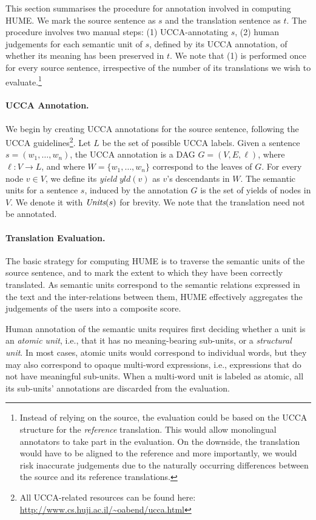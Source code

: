 \documentclass[11pt]{article}
\def\func#1{\text{\it #1}}  %
\def\Units{\func{Units}}
\begin{document}
This section summarises the procedure for annotation involved in computing HUME.
We mark the source sentence as $s$ and the translation sentence as $t$. 
The procedure involves two manual steps: (1) UCCA-annotating $s$, 
(2) human judgements for each semantic unit of $s$,
defined by its UCCA annotation, of whether its meaning has been preserved in $t$.
We note that (1) is performed once for every source sentence, irrespective
of the number of its translations we wish to evaluate.\footnote{Instead of
relying on the source,
the evaluation could be based on the UCCA structure for the \emph{reference}
translation. This would allow monolingual annotators to take part in the
evaluation. On the downside, the translation would have to be aligned to the
reference and more importantly, we would risk inaccurate judgements due to
the naturally occurring differences between the source and its reference
translations.}

\paragraph{UCCA Annotation.}
We begin by creating UCCA annotations for the source sentence, following the
UCCA guidelines\footnote{All UCCA-related resources can be found
  here: \url{http://www.cs.huji.ac.il/~oabend/ucca.html}}.
Let $L$ be the set of possible UCCA labels.
Given a sentence $s = (w_1, \ldots,w_n)$, the UCCA annotation is a DAG $G=(V,E,\ell)$,
where $\ell: V \rightarrow L$, and where $W = \{w_1,\ldots,w_n\}$ correspond to the leaves of $G$.
For every node $v \in V$, we define its {\it yield} $yld(v)$ as $v$'s descendants in $W$.
The semantic units for a sentence $s$, induced by the annotation $G$
is the set of yields of nodes in $V$. We denote it with $\Units(s)$ for brevity.
We note that the translation need not be annotated.

\paragraph{Translation Evaluation.}
The basic strategy for computing HUME is to traverse
the semantic units of the source sentence, and to mark the extent to which
they have been correctly translated. As semantic units correspond to the
semantic relations expressed in the text and the inter-relations between them,
HUME effectively aggregates the judgements of the users into a composite score.

Human annotation of the semantic units requires first deciding whether
a unit is an {\it atomic unit}, i.e., that it has no meaning-bearing
sub-units, or a {\it structural unit}. In most cases, atomic units would
correspond to individual words, but they may also correspond to opaque
multi-word expressions, i.e., expressions that do not have meaningful sub-units.
When a multi-word unit is labeled as atomic, all its sub-units' annotations are discarded
from the evaluation.
\end{document}
